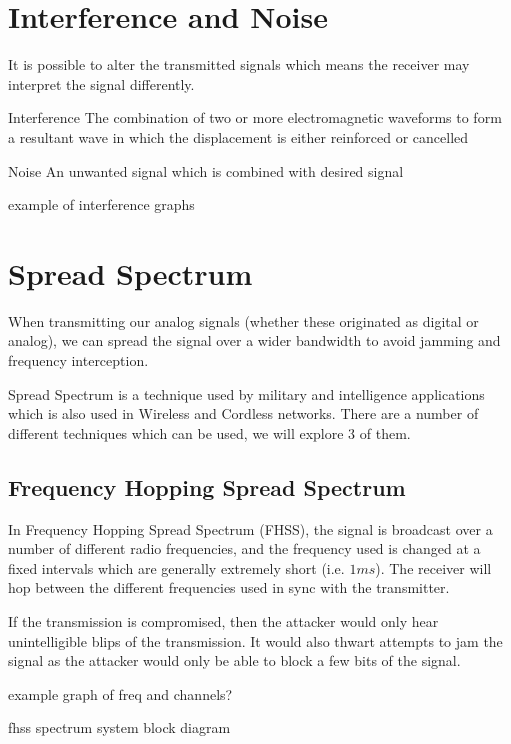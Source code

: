 \section{Interference and Noise}
It is possible to alter the transmitted signals which means the receiver may interpret the signal differently. 

\begin{define}
\item[Interference] The combination of two or more electromagnetic waveforms to form a resultant wave in which the displacement is either reinforced or cancelled
\item[Noise] An unwanted signal which is combined with desired signal 
\end{define}

\begin{todo}
example of interference graphs
\end{todo}

\section{Spread Spectrum}
When transmitting our analog signals (whether these originated as digital or analog), we can spread the signal over a wider bandwidth to avoid jamming and frequency interception. 

Spread Spectrum is a technique used by military and intelligence applications which is also used in Wireless and Cordless networks. There are a number of different techniques which can be used, we will explore 3 of them. 

\subsection{Frequency Hopping Spread Spectrum}
In Frequency Hopping Spread Spectrum (FHSS), the signal is broadcast over a number of different radio frequencies, and the frequency used is changed at a fixed intervals which are generally extremely short (i.e. $1 ms$). The receiver will hop between the different frequencies used in sync with the transmitter.

If the transmission is compromised, then the attacker would only hear unintelligible blips of the transmission. It would also thwart attempts to jam the signal as the attacker would only be able to block a few bits of the signal. 

\begin{todo}
example graph of freq and channels?

fhss spectrum system block diagram
\end{todo}


